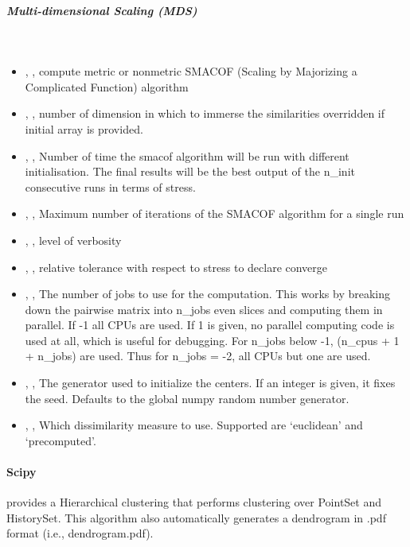 \subparagraph{Multi-dimensional Scaling (MDS)} \hfil \\
\label{subparagraph:MDS}

\begin{itemize}
	\item {}, , compute metric or nonmetric SMACOF
	 (Scaling by Majorizing a Complicated Function) algorithm 
	\item {}, , number of dimension in
	which to immerse the similarities overridden if initial array is provided. 
	\item {}, , Number of time the smacof
	algorithm will be run with different initialisation. The final results will be the best
	 output of the n\_init consecutive runs in terms of stress. 
	\item {}, , Maximum number of iterations
	of the SMACOF algorithm for a single run 
	\item {}, , level of verbosity 
	\item {}, , relative tolerance with respect
	to stress to declare converge 
	\item {}, , The number of jobs to use for
	the computation. This works by breaking down the pairwise matrix into n\_jobs even slices
	 and computing them in parallel. If -1 all CPUs are used. If 1 is given, no parallel
	 computing code is used at all, which is useful for debugging. For n\_jobs below -1,
	(n\_cpus + 1 + n\_jobs) are used. Thus for n\_jobs = -2, all CPUs but one are used.
	\item {}, ,
	The generator used to initialize the centers. If an integer is given, it fixes the seed.
	Defaults to the global numpy random number generator. 
	\item {}, , Which dissimilarity
	measure to use. Supported are ‘euclidean’ and ‘precomputed’. 
\end{itemize}


\paragraph{Scipy}
 provides a Hierarchical clustering that performs clustering over PointSet and HistorySet.
This algorithm also automatically generates a dendrogram in .pdf format (i.e., dendrogram.pdf).

